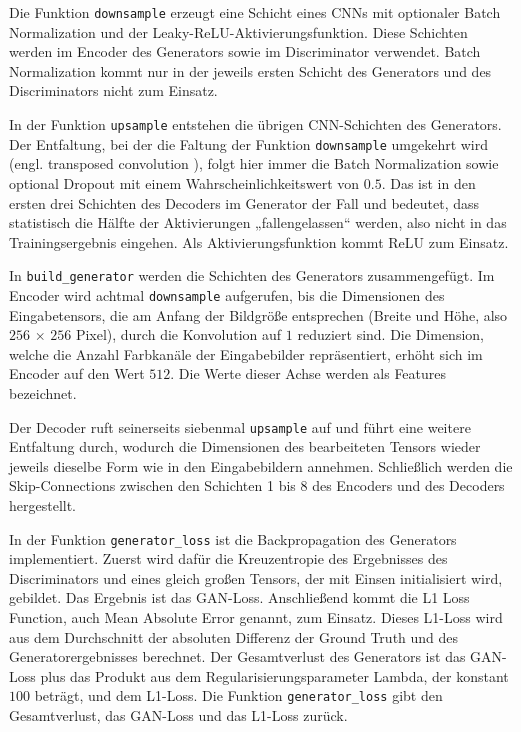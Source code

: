 Die Funktion \lstinline|downsample| erzeugt eine Schicht eines CNNs mit optionaler Batch Normalization und der Leaky-ReLU-Aktivierungsfunktion. Diese Schichten werden im Encoder des Generators sowie im Discriminator verwendet. Batch Normalization kommt nur in der jeweils ersten Schicht des Generators und des Discriminators nicht zum Einsatz.

In der Funktion \lstinline|upsample| entstehen die übrigen CNN-Schichten des Generators. Der Entfaltung, bei der die Faltung der Funktion \lstinline|downsample| umgekehrt wird (engl. transposed convolution \cite{zaccone2018tensorflow}), folgt hier immer die Batch Normalization sowie optional Dropout mit einem Wahrscheinlichkeitswert von $0.5$. Das ist in den ersten drei Schichten des Decoders im Generator der Fall und bedeutet, dass statistisch die Hälfte der Aktivierungen „fallengelassen“ werden, also nicht in das Trainingsergebnis eingehen. Als Aktivierungsfunktion kommt ReLU zum Einsatz.

In \lstinline|build_generator| werden die Schichten des Generators zusammengefügt. Im Encoder wird achtmal \lstinline|downsample| aufgerufen, bis die Dimensionen des Eingabetensors, die am Anfang der Bildgröße entsprechen (Breite und Höhe, also $256\,\times\,256$ Pixel), durch die Konvolution auf $1$ reduziert sind. Die Dimension, welche die Anzahl Farbkanäle der Eingabebilder repräsentiert, erhöht sich im Encoder auf den Wert $512$. Die Werte dieser Achse werden als Features \cite{zhang2020dive} \cite{chollet2021deep} \cite{zaccone2018tensorflow} bezeichnet.

Der Decoder ruft seinerseits siebenmal \lstinline|upsample| auf und führt eine weitere Entfaltung durch, wodurch die Dimensionen des bearbeiteten Tensors wieder jeweils dieselbe Form wie in den Eingabebildern annehmen. Schließlich werden die Skip-Connections zwischen den Schichten 1 bis 8 des Encoders und des Decoders hergestellt.

In der Funktion \lstinline|generator_loss| ist die Backpropagation des Generators implementiert. Zuerst wird dafür die Kreuzentropie des Ergebnisses des Discriminators und eines gleich großen Tensors, der mit Einsen initialisiert wird, gebildet. Das Ergebnis ist das GAN-Loss. Anschließend kommt die L1 Loss Function, auch Mean Absolute Error genannt, zum Einsatz. Dieses L1-Loss wird aus dem Durchschnitt der absoluten Differenz der Ground Truth und des Generatorergebnisses berechnet. Der Gesamtverlust des Generators ist das GAN-Loss plus das Produkt aus dem Regularisierungsparameter Lambda, der konstant $100$ beträgt, und dem L1-Loss. Die Funktion \lstinline|generator_loss| gibt den Gesamtverlust, das GAN-Loss und das L1-Loss zurück.

